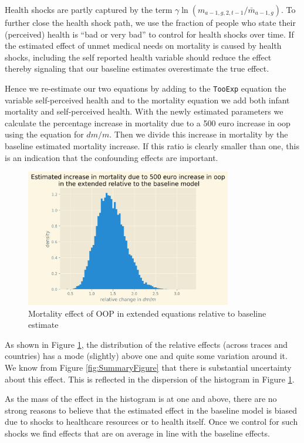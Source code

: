 \documentclass[a4paper,12pt]{article}
\begin{document}
Health shocks are partly captured by the term \(\gamma \ln(m_{a-1,g,2,t-1}/\bar m_{a-1,g})\). To further close the health shock path, we use the fraction of people who state their (perceived) health is ``bad or very bad'' to control for health shocks over time. If the estimated effect of unmet medical needs on mortality is caused by health shocks, including the self reported health variable should reduce the effect thereby signaling that our baseline estimates overestimate the true effect.

Hence we re-estimate our two equations by adding to the \texttt{TooExp} equation the variable self-perceived health and to the mortality equation we add both infant mortality and self-perceived health. With the newly estimated parameters we calculate the percentage increase in mortality due to a 500 euro increase in oop using the equation for \(dm/m\). Then we divide this increase in mortality by the baseline estimated mortality increase. If this ratio is clearly smaller than one, this is an indication that the confounding effects are important.

\begin{figure}[htbp]
\centering
\includegraphics[height=6cm]{./figures/histogram_colliders.png}
\caption{\label{fig:hist_colliders}Mortality effect of OOP in extended equations relative to baseline estimate}
\end{figure}

As shown in Figure \ref{fig:hist_colliders}, the distribution of the relative effects (across traces and countries) has a mode (slightly) above one and quite some variation around it. We know from Figure \ref{fig:SummaryFigure} that there is substantial uncertainty about this effect. This is reflected in the dispersion of the histogram in Figure \ref{fig:hist_colliders}. 

As the mass of the effect in the histogram is at one and above, there are no strong reasons to believe that the estimated effect in the baseline model is biased due to shocks to healthcare resources or to health itself. Once we control for such shocks we find effects that are on average in line with the baseline effects. 
\end{document}
